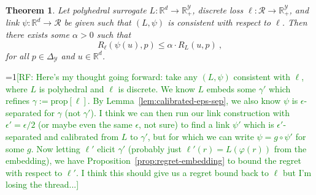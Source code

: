 \documentclass[12pt]{article}
\newcommand{\Comments}{1}
\newcommand{\mynote}[2]{\ifnum\Comments=1\textcolor{#1}{#2}\fi}
\newcommand{\raf}[1]{\mynote{green}{[RF: #1]}}
\newcommand{\reals}{\mathbb{R}}
\newcommand{\prop}[1]{\mathrm{prop}[#1]}
\newcommand{\simplex}{\Delta_\Y}
\newcommand{\R}{\mathcal{R}}
\newcommand{\Y}{\mathcal{Y}}
\newcommand{\risk}[1]{\underline{#1}}
\newcommand{\inprod}[2]{\langle #1, #2 \rangle}%
\newcommand{\regret}[3]{R_{#1}(#2,#3)}
\newtheorem{theorem}{Theorem}
\begin{document}
\begin{theorem}\label{thm:regret-bound-poly-consistent}
  Let polyhedral surrogate $L:\reals^d \to \reals^\Y_+$, discrete loss $\ell:\R\to\reals^\Y_+$, and link $\psi:\reals^d\to\R$ be given such that $(L,\psi)$ is consistent with respect to $\ell$.
  Then there exists some $\alpha > 0$ such that
  \begin{equation}
    \label{eq:surrogate-regret-bound}
    \regret{\ell}{\psi(u)}{p}
    \leq
    \alpha \cdot \regret{L}{u}{p}~,
  \end{equation}
  for all $p\in\simplex$ and $u\in\reals^d$.
\end{theorem}

\raf{Here's my thought going forward: take any $(L,\psi)$ consistent with $\ell$, where $L$ is polyhedral and $\ell$ is discrete.  We know $L$ embeds some $\gamma'$ which refines $\gamma := \prop{\ell}$.  By Lemma~\ref{lem:calibrated-eps-sep}, we also know $\psi$ is $\epsilon$-separated for $\gamma$ (not $\gamma'$).  I think we can then run our link construction with $\epsilon' = \epsilon/2$ (or maybe even the same $\epsilon$, not sure) to find a link $\psi'$ which is $\epsilon'$-separated and calibrated from $L$ to $\gamma'$, but for which we can write $\psi = g \circ \psi'$ for some $g$.  Now letting $\ell'$ elicit $\gamma'$ (probably just $\ell'(r) = L(\varphi(r))$ from the embedding), we have Proposition~\ref{prop:regret-embedding} to bound the regret with respect to $\ell'$.  I think this should give us a regret bound back to $\ell$ but I'm losing the thread...}
\end{document}

